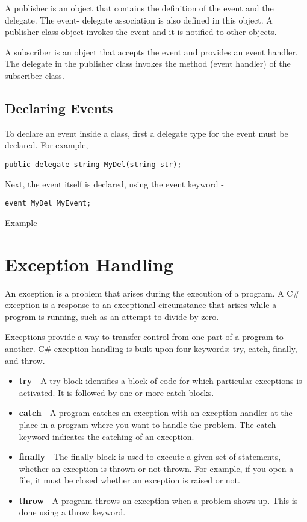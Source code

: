 A publisher is an object that contains the definition of the event and the delegate. The event-
delegate association is also defined in this object. A publisher class object invokes the event and it is
notified to other objects.

A subscriber is an object that accepts the event and provides an event handler. The delegate in the
publisher class invokes the method (event handler) of the subscriber class.

\subsection*{Declaring Events}
To declare an event inside a class, first a delegate type for the event must be declared. For example,

\begin{lstlisting}[numbers=none]
public delegate string MyDel(string str);
\end{lstlisting}

Next, the event itself is declared, using the event keyword -
\begin{lstlisting}[numbers=none]
event MyDel MyEvent;
\end{lstlisting}

\noindent Example




\section{Exception Handling}
An exception is a problem that arises during the execution of a program. A C\# exception is a
response to an exceptional circumstance that arises while a program is running, such as an attempt
to divide by zero.

Exceptions provide a way to transfer control from one part of a program to another. C\# exception
handling is built upon four keywords: try, catch, finally, and throw.

\begin{itemize}
	\item \textbf{try} - A try block identifies a block of code for which particular exceptions is activated. It is
	followed by one or more catch blocks.
	\item \textbf{catch} - A program catches an exception with an exception handler at the place in a program
	where you want to handle the problem. The catch keyword indicates the catching of an
	exception.
	\item \textbf{finally} - The finally block is used to execute a given set of statements, whether an exception
	is thrown or not thrown. For example, if you open a file, it must be closed whether an
	exception is raised or not.
	\item \textbf{throw} - A program throws an exception when a problem shows up. This is done using a
	throw keyword.
\end{itemize}


